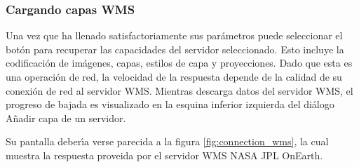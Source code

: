 
\subsubsection{Cargando capas WMS}\label{sec:ogc-wms-layers}

Una vez que ha llenado satisfactoriamente sus par\'ametros puede seleccionar el bot\'on
para recuperar las capacidades del servidor seleccionado.  Esto incluye la codificaci\'on de im\'agenes,
capas, estilos de capa y proyecciones.  Dado que esta
es una operaci\'on de red, la velocidad de la respuesta depende de la calidad de su conexi\'on de red
al servidor WMS. Mientras descarga datos del servidor WMS, el progreso de bajada
es visualizado en la esquina inferior izquierda del di\'alogo A\~nadir capa de un servidor. 

Su pantalla deber\'{\i}a verse parecida a la figura \ref{fig:connection_wms}, la cual muestra la
respuesta proveida por el servidor WMS NASA JPL OnEarth.

